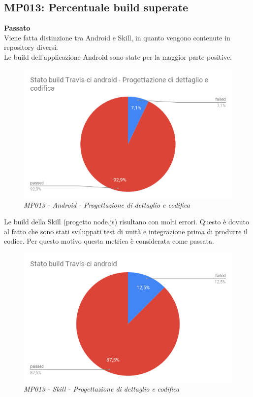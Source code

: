 \subsection{MP013: Percentuale build superate}
\textbf{Passato}\\
Viene fatta distinzione tra Android e Skill, in quanto vengono contenute in repository diversi.\\
Le build dell'applicazione Android sono state per la maggior parte positive. \\
\begin{figure} [H]
    \centering
	\includegraphics[scale=0.4]{./images/buildandroidPDC.png}
    \caption{\textit{MP013 - Android - Progettazione di dettaglio e codifica}}\label{}
\end{figure}
Le build della Skill (progetto node.js) risultano con molti errori. Questo è dovuto al fatto che sono stati sviluppati test di unità e integrazione prima di produrre il codice. Per questo motivo questa metrica è considerata come passata.\\
\begin{figure} [H]
    \centering
	\includegraphics[scale=0.4]{./images/buildPDC.png}
    \caption{\textit{MP013 - Skill - Progettazione di dettaglio e codifica}}\label{}
\end{figure}

